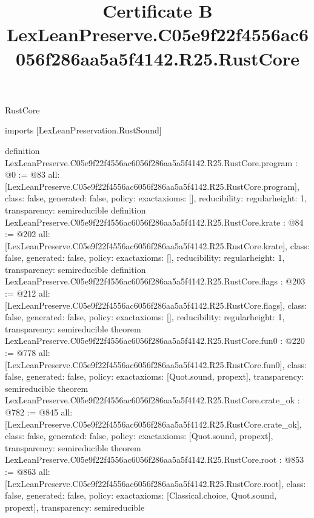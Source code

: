 \begin{lexlean}{RustCore}
\title{Certificate B LexLeanPreserve.C05e9f22f4556ac6056f286aa5a5f4142.R25.RustCore}
\begin{coremodule}
imports [LexLeanPreservation.RustSound]

definition LexLeanPreserve.C05e9f22f4556ac6056f286aa5a5f4142.R25.RustCore.program : @0 := @83 {
  all: [LexLeanPreserve.C05e9f22f4556ac6056f286aa5a5f4142.R25.RustCore.program],
  class: false,
  generated: false,
  policy: exact{axioms: []},
  reducibility: regular{height: 1},
  transparency: semireducible
}
definition LexLeanPreserve.C05e9f22f4556ac6056f286aa5a5f4142.R25.RustCore.krate : @84 := @202 {
  all: [LexLeanPreserve.C05e9f22f4556ac6056f286aa5a5f4142.R25.RustCore.krate],
  class: false,
  generated: false,
  policy: exact{axioms: []},
  reducibility: regular{height: 1},
  transparency: semireducible
}
definition LexLeanPreserve.C05e9f22f4556ac6056f286aa5a5f4142.R25.RustCore.flags : @203 := @212 {
  all: [LexLeanPreserve.C05e9f22f4556ac6056f286aa5a5f4142.R25.RustCore.flags],
  class: false,
  generated: false,
  policy: exact{axioms: []},
  reducibility: regular{height: 1},
  transparency: semireducible
}
theorem LexLeanPreserve.C05e9f22f4556ac6056f286aa5a5f4142.R25.RustCore.fun0 : @220 := @778 {
  all: [LexLeanPreserve.C05e9f22f4556ac6056f286aa5a5f4142.R25.RustCore.fun0],
  class: false,
  generated: false,
  policy: exact{axioms: [Quot.sound, propext]},
  transparency: semireducible
}
theorem LexLeanPreserve.C05e9f22f4556ac6056f286aa5a5f4142.R25.RustCore.crate_ok : @782 := @845 {
  all: [LexLeanPreserve.C05e9f22f4556ac6056f286aa5a5f4142.R25.RustCore.crate_ok],
  class: false,
  generated: false,
  policy: exact{axioms: [Quot.sound, propext]},
  transparency: semireducible
}
theorem LexLeanPreserve.C05e9f22f4556ac6056f286aa5a5f4142.R25.RustCore.root : @853 := @863 {
  all: [LexLeanPreserve.C05e9f22f4556ac6056f286aa5a5f4142.R25.RustCore.root],
  class: false,
  generated: false,
  policy: exact{axioms: [Classical.choice, Quot.sound, propext]},
  transparency: semireducible
}


\end{coremodule}
\end{lexlean}
